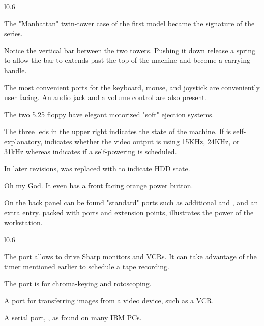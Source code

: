 \begin{wrapfigure}[37]{l}{0.6\textwidth}
\centering
{}
\end{wrapfigure}

The "Manhattan" twin-tower case of the first model became the signature of the series. 

Notice the vertical bar between the two towers. Pushing it down release a spring to allow the bar to extends past the top of the machine and become a carrying handle.


The most convenient ports for the keyboard, mouse, and joystick are conveniently user facing. An audio jack and a volume control are also present.

The two 5.25 floppy have elegant motorized "soft" ejection systems.

The three leds in the upper right indicates the state of the machine. If  is self-explanatory,  indicates whether the video output is using 15KHz, 24KHz, or 31kHz whereas  indicates if a self-powering is scheduled. 

In later revisions,  was replaced with  to indicate HDD state.

Oh my God. It even has a front facing orange power button.

On the back panel can be found "standard" ports such as additional  and , and an extra  entry.  packed with ports and extension points, illustrates the power of the workstation.

\pagebreak

\begin{wrapfigure}[35]{l}{0.6\textwidth}
\centering
{}
\end{wrapfigure}



The  port allows to drive Sharp monitors and VCRs. It can take advantage of the timer mentioned earlier to schedule a tape recording.

The  port is for chroma-keying and rotoscoping.

A  port for transferring images from a video device, such as a VCR.

A serial port, , as found on many IBM PCs.



